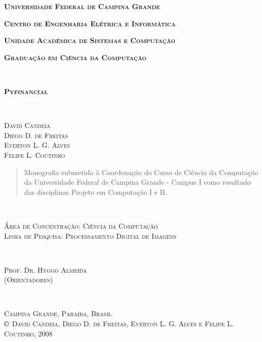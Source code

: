 \pagestyle{empty}

\begin{center}
{\textbf{\Large \textsc{Universidade Federal de Campina Grande}}}
\end{center}

\begin{center}
\textbf{{\Large \textsc{Centro de Engenharia Elétrica e
Informática}}}
\end{center}

\begin{center}
\textbf{{\Large \textsc{Unidade Acadêmica de Sistemas e
Computação}}}
\end{center}

\begin{center}
{\large \textsc{\textbf{Graduação em Ciência da Computação}}}
\end{center}


~\\


\begin{center}
{\Large \textsc{\textbf{Pyfinancial}}}
\end{center}
~\\

\begin{center}
\large{\textsc{David Candeia}\\ \textsc{Diego D. de Freitas}\\ \textsc{Everton L. G. Alves}\\
\textsc{Felipe L. Coutinho}}
\end{center}

\begin{quote}
\small{Monografia submetida à Coordenação do Curso de Ciência da
Computação da Universidade Federal de Campina Grande - Campus I como
resultado das disciplinas Projeto em Computação I e II.}
\end{quote}
~\\

\begin{center}
\textsc{Área de Concentração: Ciência da Computação }\\
\textsc{Linha de Pesquisa: Processamento Digital de Imagens}\\
\end{center}
~\\

\begin{center}
\textsc{Prof. Dr. Hyggo Almeida}\\
\textsc{(Orientadores)}\\
\end{center}
~

\begin{center}
{\small \textsc{Campina Grande, Paraíba, Brasil}}\\
{\small \textsc{$\copyright$ David Candeia, Diego D. de Freitas, Everton L. G. Alves e Felipe L. Coutinho, 2008}}
\end{center}

\newpage
\cleardoublepage
